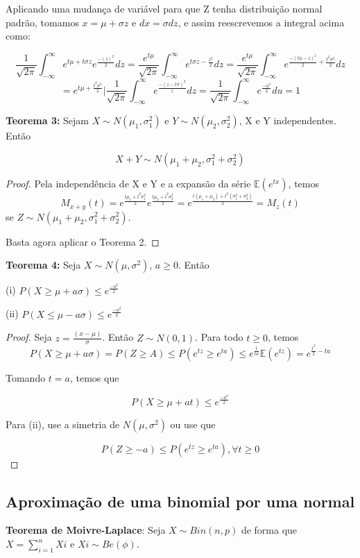 Aplicando uma mudança de variável para que Z tenha distribuição normal padrão, tomamos $x = \mu + \sigma z$ e $dx = \sigma dz$, e assim reescrevemos a integral acima como:

\[\frac{1}{\sqrt{2\pi}}\int_{-\infty}^\infty e^{t\mu+t\sigma z}e^\frac{-(z)^2}{2}dz = \frac{e^{t\mu}}{\sqrt{2\pi}}\int_{-\infty}^\infty e^{t\sigma z - \frac{z^2}{2}}dz = \frac{e^{t\mu}}{\sqrt{2\pi}}\int_{-\infty}^\infty e^{\frac{-(t\mu-z)^2}{2} + \frac{t^2 \sigma^2}{2}}dz\]
\[= e^{t\mu+\frac{t^2 \sigma^2}{2}}\Big|\frac{1}{\sqrt{2\pi}}\int_{-\infty}^\infty e^{\frac{-(z-t\sigma)^2}{z}}dz = \frac{1}{\sqrt{2\pi}}\int_{-\infty}^\infty e^{\frac{-u^2}{2}}du = 1\]

\textbf{Teorema 3:} Sejam $X\sim N(\mu_{1},\sigma_{1}^2)$ e $Y\sim N(\mu_{2},\sigma_{2}^2)$, X e Y independentes. Então

\[X+Y\sim N(\mu_{1}+\mu_{2}, \sigma_{1}^2+\sigma_{2}^2)\]

\begin{proof}
Pela independência de X e Y e a expansão da série $\mathbb{E}(e^{tx})$, temos
\[M_{x+y}(t) = e^{\frac{t\mu_{1}+t^2\sigma_{1}^2}{2}}e^{\frac{t\mu_{2}+t^2\sigma_{2}^2}{2}} = e^{\frac{t(\mu_{1}+\mu_{2})+t^2(\sigma_{1}^2+\sigma_{2}^2)}{2}} = M_{z}(t)\]
se $Z\sim N(\mu_{1}+\mu_{2},\sigma_{1}^2+\sigma_{2}^2)$.

Basta agora aplicar o Teorema 2.
\end{proof}

\textbf{Teorema 4:} Seja $X\sim N(\mu,\sigma^2)$, $a\geq0$. Então

(i) $P(X\geq\mu+a\sigma)\leq e^{\frac{-a^2}{2}}$

(ii) $P(X\leq\mu-a\sigma)\leq e^{\frac{-a^2}{2}}$

\begin{proof}
Seja $z = \frac{(x - \mu)}{\sigma}$. Então $Z\sim N(0,1)$. Para todo $t\geq 0$, temos
\[P(X\geq\mu+a\sigma) = P(Z\geq A) \leq P(e^{tz}\geq e^{ta})\leq e^{\frac{1}{ta}}\mathbb{E}(e^{tz}) = e^{\frac{t^2}{2}-ta}\]

Tomando $t=a$, temos que

\[P(X\geq\mu+at)\leq e^{\frac{-a^2}{2}}\]

Para (ii), use a simetria de $N(\mu,\sigma^2)$ ou use que

\[P(Z\geq -a)\leq P(e^{tz}\geq e^{ta}), \forall t \geq 0\]
\end{proof}

\subsection{Aproximação de uma binomial por uma normal}
\textbf{Teorema de Moivre-Laplace}: Seja $X\sim Bin(n,p)$ de forma que $X = \sum_{i=1}^n Xi$ e $Xi\sim Be(\phi)$.

